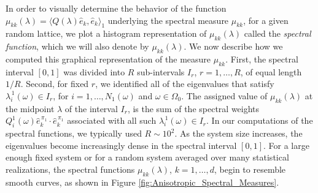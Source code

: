 \documentclass{cmslatex}
\begin{document}
In order to visually determine the behavior of the function
$\mu_{kk}(\lambda)=\langle Q(\lambda)\hat{e}_k,\hat{e}_k\rangle_1$ underlying the spectral
measure $\mu_{kk}$, for a given random lattice, we plot a histogram
representation of $\mu_{kk}(\lambda)$ called the \emph{spectral function},
which we will also denote by $\mu_{kk}(\lambda)$. We now describe how 
we computed this graphical representation of the measure
$\mu_{kk}$. First, the spectral interval $[0,1]$ was divided into $R$
sub-intervals $I_r$, $r=1,\ldots,R$, of equal length $1/R$. Second, for
fixed $r$, we identified all of the eigenvalues that satisfy
$\lambda^{\,1}_i(\omega)\in I_r$, for $i=1,\ldots,N_1(\omega)$ and $\omega\in\Omega_0$. The assigned
value of $\mu_{kk}(\lambda)$ at the midpoint $\lambda$ of the interval $I_r$, is the
sum of the spectral weights
$Q^1_i(\omega)\hat{e}_k^{\,\pi_1}\cdot\hat{e}_k^{\,\pi_1}$ associated with all such
$\lambda^{\,1}_i(\omega)\in I_r$. In our computations of the spectral functions, we 
typically used $R\sim10^2$. As the system size increases, the eigenvalues
become increasingly dense in the spectral interval $[0,1]$. For a
large enough fixed system or for a random system averaged over many
statistical realizations, the spectral functions $\mu_{kk}(\lambda)$,
$k=1,\ldots,d$, begin to resemble smooth curves, as shown in Figure 
\ref{fig:Anisotropic_Spectral_Measures}.     
\end{document}
